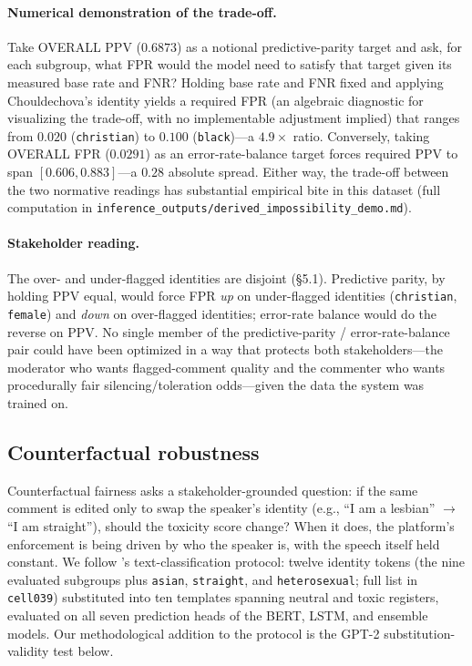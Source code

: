 \documentclass[11pt]{article}
\begin{document}
\paragraph{Numerical demonstration of the trade-off.} Take OVERALL PPV ($0.6873$) as a notional predictive-parity target and ask, for each subgroup, what FPR would the model need to satisfy that target given its measured base rate and FNR? Holding base rate and FNR fixed and applying Chouldechova's identity yields a required FPR (an algebraic diagnostic for visualizing the trade-off, with no implementable adjustment implied) that ranges from $0.020$ (\texttt{christian}) to $0.100$ (\texttt{black})---a $4.9\times$ ratio. Conversely, taking OVERALL FPR ($0.0291$) as an error-rate-balance target forces required PPV to span $[0.606, 0.883]$---a $0.28$ absolute spread. Either way, the trade-off between the two normative readings has substantial empirical bite in this dataset (full computation in \texttt{inference\_outputs/derived\_impossibility\_demo.md}).

\paragraph{Stakeholder reading.} The over- and under-flagged identities are disjoint (\S5.1). Predictive parity, by holding PPV equal, would force FPR \emph{up} on under-flagged identities (\texttt{christian}, \texttt{female}) and \emph{down} on over-flagged identities; error-rate balance would do the reverse on PPV. No single member of the predictive-parity / error-rate-balance pair could have been optimized in a way that protects both stakeholders---the moderator who wants flagged-comment quality and the commenter who wants procedurally fair silencing/toleration odds---given the data the system was trained on.

\subsection{Counterfactual robustness}

Counterfactual fairness \citep{kusner2017counterfactual} asks a stakeholder-grounded question: if the same comment is edited only to swap the speaker's identity (e.g., ``I am a lesbian'' $\to$ ``I am straight''), should the toxicity score change? When it does, the platform's enforcement is being driven by who the speaker is, with the speech itself held constant. We follow \citet{garg2019counterfactual}'s text-classification protocol: twelve identity tokens (the nine evaluated subgroups plus \texttt{asian}, \texttt{straight}, and \texttt{heterosexual}; full list in \texttt{cell039}) substituted into ten templates spanning neutral and toxic registers, evaluated on all seven prediction heads of the BERT, LSTM, and ensemble models. Our methodological addition to the protocol is the GPT-2 substitution-validity test below.
\end{document}
